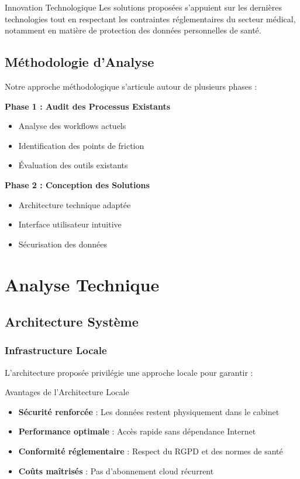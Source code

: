 \documentclass{modern-report}
\begin{document}
\begin{infobox}{Innovation Technologique}
Les solutions proposées s'appuient sur les dernières technologies tout en respectant les contraintes réglementaires du secteur médical, notamment en matière de protection des données personnelles de santé.
\end{infobox}

\section{Méthodologie d'Analyse}

Notre approche méthodologique s'articule autour de plusieurs phases :

\modernseparator

\textbf{Phase 1 : Audit des Processus Existants}
\begin{itemize}
    \item Analyse des workflows actuels
    \item Identification des points de friction
    \item Évaluation des outils existants
\end{itemize}

\textbf{Phase 2 : Conception des Solutions}
\begin{itemize}
    \item Architecture technique adaptée
    \item Interface utilisateur intuitive
    \item Sécurisation des données
\end{itemize}

\chapter{Analyse Technique}

\section{Architecture Système}

\subsection{Infrastructure Locale}

L'architecture proposée privilégie une approche locale pour garantir :

\begin{modernbox}{Avantages de l'Architecture Locale}
\begin{itemize}
    \item \textbf{Sécurité renforcée} : Les données restent physiquement dans le cabinet
    \item \textbf{Performance optimale} : Accès rapide sans dépendance Internet
    \item \textbf{Conformité réglementaire} : Respect du RGPD et des normes de santé
    \item \textbf{Coûts maîtrisés} : Pas d'abonnement cloud récurrent
\end{itemize}
\end{modernbox}
\end{document}
